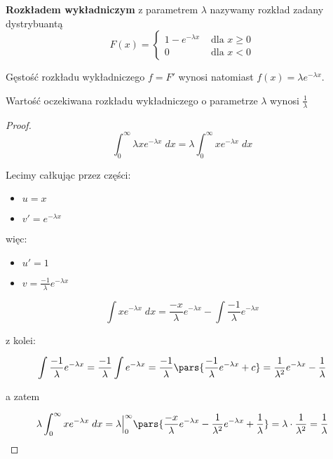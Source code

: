 \begin{definition}
    \textbf{Rozkładem wykładniczym} z parametrem \( \lambda \) nazywamy rozkład zadany dystrybuantą
    \[
        F(x) = \begin{cases}
            1 - e^{-\lambda x} & \text{ dla } x \geq 0 \\
            0 & \text{ dla } x < 0
        \end{cases}
    \]
\end{definition}

Gęstość rozkładu wykładniczego \( f = F' \) wynosi natomiast \( f(x) = \lambda e^{-\lambda x} \).

\begin{lemma}
 Wartość oczekiwana rozkładu wykładniczego o parametrze \( \lambda \) wynosi \( \frac{1}{\lambda} \)
\end{lemma}
\begin{proof}
    \[
        \int_{0}^{\infty} \lambda x e^{-\lambda x} \; dx = \lambda \int_{0}^{\infty} x e^{-\lambda x} \; dx
    \]
    
    Lecimy całkując przez części: 
    
    \begin{itemize}
        \item \(u =  x\)
        \item \(v' = e^{-\lambda x}\) 
    \end{itemize}
    
    więc:
    
    \begin{itemize}
        \item \(u' = 1\)
        \item \(v = \frac{-1}{\lambda} e^{-\lambda x}\)
    \end{itemize}
    
    \[
        \int x e^{-\lambda x} \; dx = \frac{-x}{\lambda} e^{-\lambda x} - \int \frac{-1}{\lambda} e^{-\lambda x}
    \]
    
    z kolei:
    
    \[ 
        \int \frac{-1}{\lambda} e^{-\lambda x} = \frac{-1}{\lambda} \int e^{-\lambda x} = \frac{-1}{\lambda} \pars{\frac{-1}{\lambda} e^{-\lambda x} + c} = \frac{1}{\lambda^2} e^{-\lambda x} - \frac{1}{\lambda}
    \]
    
    a zatem 
    
    \[ 
        \lambda \int_{0}^{\infty} x e^{-\lambda x} \; dx = \lambda \Big\rvert_{0}^{\infty} \pars{\frac{-x}{\lambda} e^{-\lambda x} - \frac{1}{\lambda^2} e^{-\lambda x} + \frac{1}{\lambda} } = \lambda \cdot \frac{1}{\lambda^2} = \frac{1}{\lambda}
    \]
\end{proof}


